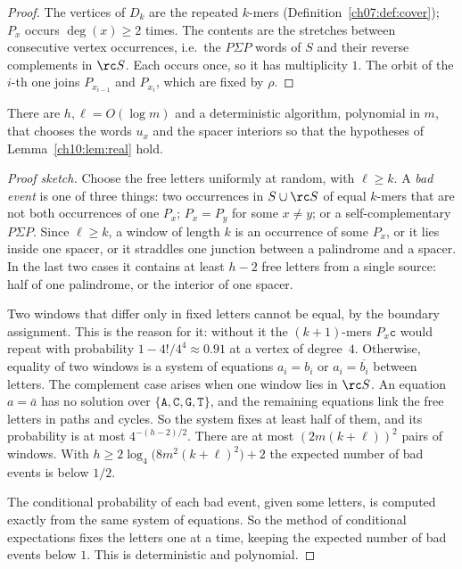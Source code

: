 \begin{proof}
The vertices of $D_k$ are the repeated $k$-mers (Definition~\ref{ch07:def:cover}); $P_x$ occurs $\deg(x)\ge2$ times. The contents
are the stretches between consecutive vertex occurrences, i.e.\ the $P\Sigma P$ words of $S$ and their
reverse complements in $\rc S$. Each occurs once, so it has multiplicity $1$. The orbit of the $i$-th one
joins $P_{x_{i-1}}$ and $P_{x_i}$, which are fixed by $\rho$.
\end{proof}

\begin{lemma}\label{ch10:lem:derand}
There are $h,\ell=O(\log m)$ and a deterministic algorithm, polynomial in $m$, that chooses the words $u_x$
and the spacer interiors so that the hypotheses of Lemma~\ref{ch10:lem:real} hold.
\end{lemma}

\begin{proof}[Proof sketch]
Choose the free letters uniformly at random, with $\ell\ge k$. A \emph{bad event} is one of three things:
two occurrences in $S\cup\rc S$ of equal $k$-mers that are not both occurrences of one $P_x$; $P_x=P_y$
for some $x\ne y$; or a self-complementary $P\Sigma P$. Since $\ell\ge k$, a window of length $k$ is an
occurrence of some $P_x$, or it lies inside one spacer, or it straddles one junction between a
palindrome and a spacer. In the last two cases it contains at least $h-2$ free letters from a single
source: half of one palindrome, or the interior of one spacer.

Two windows that differ only in fixed letters cannot be equal, by the boundary assignment. This is the
reason for it: without it the $(k+1)$-mers $P_x\mathtt c$ would repeat with probability
$1-4!/4^4\approx0.91$ at a vertex of degree~$4$. Otherwise, equality of two windows is a system of
equations $a_i=b_i$ or $a_i=\overline{b_i}$ between letters. The complement case arises when one
window lies in $\rc S$. An equation $a=\bar a$ has no solution over $\{\mathtt A,\mathtt C,\mathtt G,\mathtt T\}$,
and the remaining equations link the free letters in paths and cycles. So the system fixes at least half
of them, and its probability is at most $4^{-(h-2)/2}$. There are at most $(2m(k+\ell))^2$ pairs of
windows. With $h\ge 2\log_4\bigl(8m^2(k+\ell)^2\bigr)+2$ the expected number of bad events is below $1/2$.

The conditional probability of each bad event, given some letters, is computed exactly from the same
system of equations. So the method of conditional expectations fixes the letters one at a time,
keeping the expected number of bad events below $1$. This is deterministic and polynomial.
\end{proof}

